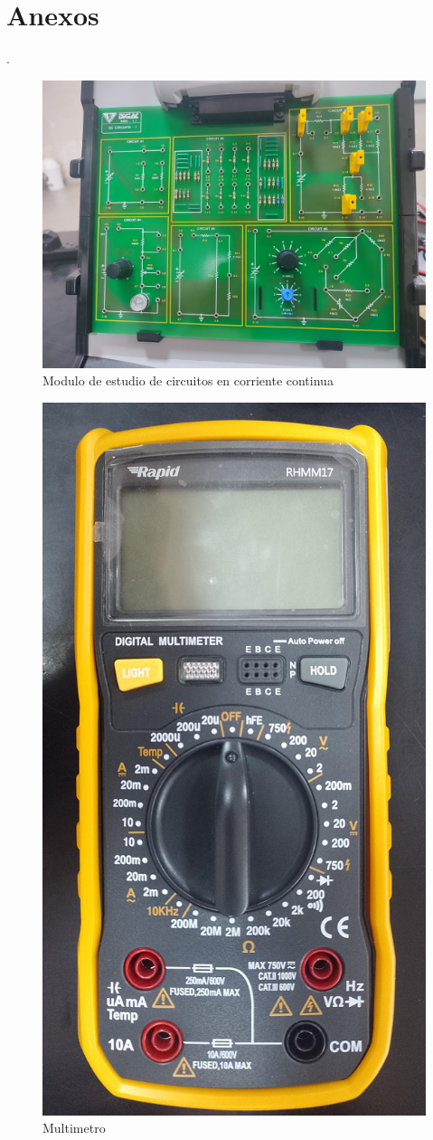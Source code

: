 \documentclass[twocolumn]{article}
\begin{document}
\vspace{-0.5cm}
\section{Anexos} 
.
\begin{otherlanguage}{spanish}

\begin{figure}[H]
    \centering
    \includegraphics[width=0.7\linewidth]{Figures/figura/WhatsApp Image 2024-11-12 at 5.19.45 PM.jpeg}
    \caption{Modulo de estudio de circuitos en corriente continua}
    \label{}
\end{figure}

\begin{figure}[H]
    \centering
    \includegraphics[width=0.3\linewidth]{Figures/figura/WhatsApp Image 2024-11-12 at 5.20.24 PM.jpeg}
    \caption{Multimetro}
    \label{}
\end{figure}


\end{otherlanguage}
\end{document}
